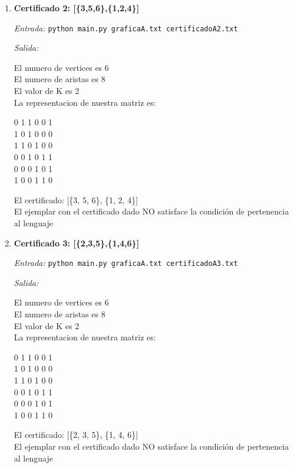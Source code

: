 \documentclass[12pt,letterpaper]{article}
\begin{document}
\begin{itemize}
\begin{itemize}
\begin{enumerate}
            \item \textbf{Certificado 2: [\{3,5,6\},\{1,2,4\}]}
            
            \textit{Entrada:}
            \texttt{python main.py graficaA.txt certificadoA2.txt}
            
            \textit{Salida:}

            El numero de vertices es 6 \\ 
            El numero de aristas es 8 \\ 
            El valor de K es 2 \\ 
            La representacion de nuestra matriz es:
            \begin{center}
                0 1 1 0 0 1 \\
                1 0 1 0 0 0 \\
                1 1 0 1 0 0 \\
                0 0 1 0 1 1 \\ 
                0 0 0 1 0 1 \\ 
                1 0 0 1 1 0 \\
            \end{center}
            
            El certificado: [\{3, 5, 6\}, \{1, 2, 4\}] \\ 
            El ejemplar con el certificado dado NO satisface la condición
            de pertenencia al lenguaje
            
            \item \textbf{Certificado 3: [\{2,3,5\},\{1,4,6\}]}
            
            \textit{Entrada:}
            \texttt{python main.py graficaA.txt certificadoA3.txt}
            
            \textit{Salida:}

            El numero de vertices es 6 \\
            El numero de aristas es 8 \\
            El valor de K es 2 \\
            La representacion de nuestra matriz es:
            \begin{center}
                0 1 1 0 0 1 \\
                1 0 1 0 0 0 \\
                1 1 0 1 0 0 \\
                0 0 1 0 1 1 \\
                0 0 0 1 0 1 \\
                1 0 0 1 1 0 \\
            \end{center}
            El certificado: [\{2, 3, 5\}, \{1, 4, 6\}] \\
            El ejemplar con el certificado dado NO satisface la condición
            de pertenencia al lenguaje
            

\end{enumerate}
\end{itemize}
\end{itemize}
\end{document}
